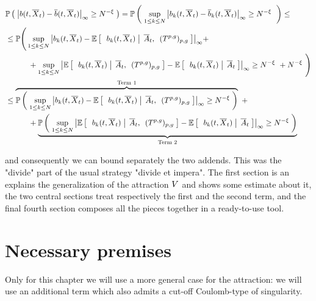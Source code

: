\begin{equation}\label{ch5:sketch-divide-et-impera}
	\begin{aligned}
		&
		\mathbb{P} \left( \; 
			{ \left| 
				b(t, \overline{X}_t)
				-
				\overline{b}(t, \overline{X}_t)
			 \right|_{\infty} }
			\geq
			N^{-\xi}
		 \; \right)
		= 
		\mathbb{P} \left( \; 
			\sup_{1\leq k \leq N} 
			{ \left| 
				b_k(t, \overline{X}_t)
				-
				\overline{b}_k(t, \overline{X}_t)
			 \right|_{\infty} }
			\geq
			N^{-\xi}\
		 \; \right)
		\leq
		\\
		&\leq
		\mathbb{P} \Bigg(
			\sup_{1\leq k \leq N} 
			{ \left| 
				b_k(t, \overline{X}_t)
				-
				\mathbb{E} \left[ \; \left. \; b_k(t, \overline{X}_t) \; \right| \;  \overline{A}_t, \:\;(T^{p,g})_{p,g} \; \right]
			 \right|_{\infty} }
			+
			\\
			&\qquad\quad
			+
			\sup_{1\leq k \leq N} 
			{ \left| 
				\mathbb{E} \left[ \; \left. \; b_k(t, \overline{X}_t) \; \right| \;  \overline{A}_t, \:\;(T^{p,g})_{p,g} \; \right]
				-
				\mathbb{E} \left[ \; \left. \; b_k(t, \overline{X}_t) \; \right| \;  \overline{A}_t \; \right]
			 \right|_{\infty} }
			\geq
			N^{-\xi}\
			+N^{-\xi}\
		\Bigg)
		\\
		&\leq
		\overbrace{
			\mathbb{P} \left( \; 
				\sup_{1\leq k \leq N} 
				{ \left| 
					b_k(t, \overline{X}_t)
					-
					\mathbb{E} \left[ \; \left. \; b_k(t, \overline{X}_t) \; \right| \;  \overline{A}_t, \:\;(T^{p,g})_{p,g} \; \right]
				 \right|_{\infty} }
				\geq
				N^{-\xi}
		 \; \right)}^{\text{Term 1}}\ +
		\\
		&\qquad\quad
		+
		\underbrace{
			\mathbb{P} \left( \; 
				\sup_{1\leq k \leq N} 
				{ \left| 
					\mathbb{E} \left[ \; \left. \; b_k(t, \overline{X}_t) \; \right| \;  \overline{A}_t, \:\;(T^{p,g})_{p,g} \; \right]
					-
					\mathbb{E} \left[ \; \left. \; b_k(t, \overline{X}_t) \; \right| \;  \overline{A}_t \; \right]
				 \right|_{\infty} }
				\geq
				N^{-\xi}
			 \; \right)
		}_{\text{Term 2}}
	\end{aligned}
\end{equation}

and consequently we can bound separately the two addends.
This was the "divide" part of the usual strategy "divide et impera".
The first section is an explains the generalization of the attraction $V$ and shows some estimate about it, the two central sections treat respectively the first and the second term, and the final fourth section composes all the pieces together in a ready-to-use tool.

\section{Necessary premises}

Only for this chapter we will use a more general case for the attraction: we will use an additional term which also admits a cut-off Coulomb-type of singularity.

